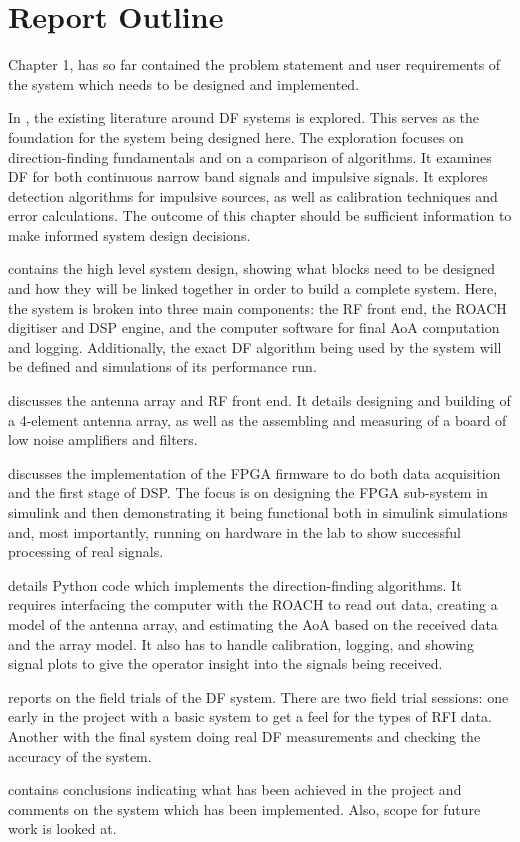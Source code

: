 \section{Report Outline}
Chapter 1, has so far contained the problem statement and user requirements of the system which needs to be designed and implemented. 

In , the existing literature around DF systems is explored. This serves as the foundation for the system being designed here. The exploration focuses on direction-finding fundamentals and on a comparison of algorithms. It examines DF for both continuous narrow band signals and impulsive signals. It explores detection algorithms for impulsive sources, as well as calibration techniques and error calculations. The outcome of this chapter should be sufficient information to make informed system design decisions.

 contains the high level system design, showing what blocks need to be designed and how they will be linked together in order to build a complete system. Here, the system is broken into three main components: the RF front end, the ROACH digitiser and DSP engine, and the computer software for final AoA computation and logging. Additionally, the exact DF algorithm being used by the system will be defined and simulations of its performance run.

 discusses the antenna array and RF front end. It details designing and building of a 4-element antenna array, as well as the assembling and measuring of a board of low noise amplifiers and filters.

 discusses the implementation of the FPGA firmware to do both data acquisition and the first stage of DSP. The focus is on designing the FPGA sub-system in simulink and then demonstrating it being functional both in simulink simulations and, most importantly, running on hardware in the lab to show successful processing of real signals.

 details Python code which implements the direction-finding algorithms. It requires interfacing the computer with the ROACH to read out data, creating a model of the antenna array, and estimating the AoA based on the received data and the array model. It also has to handle calibration, logging, and showing signal plots to give the operator insight into the signals being received.

 reports on the field trials of the DF system. There are two field trial sessions: one early in the project with a basic system to get a feel for the types of RFI data. Another with the final system doing real DF measurements and checking the accuracy of the system.

 contains conclusions indicating what has been achieved in the project and comments on the system which has been implemented. Also, scope for future work is looked at.
